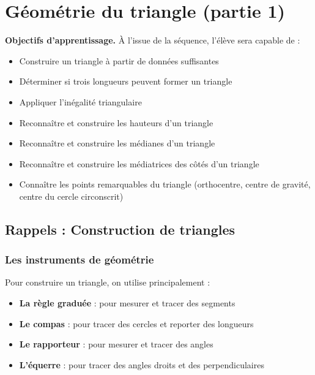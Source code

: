 \chapter{Géométrie du triangle (partie 1)}

\begin{objectifsbox}
	\textbf{Objectifs d'apprentissage.} À l'issue de la séquence, l'élève sera capable de :
	\begin{itemize}
		\item Construire un triangle à partir de données suffisantes
		\item Déterminer si trois longueurs peuvent former un triangle
		\item Appliquer l'inégalité triangulaire
		\item Reconnaître et construire les hauteurs d'un triangle
		\item Reconnaître et construire les médianes d'un triangle
		\item Reconnaître et construire les médiatrices des côtés d'un triangle
		\item Connaître les points remarquables du triangle (orthocentre, centre de gravité, centre du cercle circonscrit)
	\end{itemize}
\end{objectifsbox}

\section{Rappels : Construction de triangles}

\subsection{Les instruments de géométrie}

\begin{remarkbox}
	Pour construire un triangle, on utilise principalement :
	\begin{itemize}
		\item \textbf{La règle graduée} : pour mesurer et tracer des segments
		\item \textbf{Le compas} : pour tracer des cercles et reporter des longueurs
		\item \textbf{Le rapporteur} : pour mesurer et tracer des angles
		\item \textbf{L'équerre} : pour tracer des angles droits et des perpendiculaires
	\end{itemize}
\end{remarkbox}

